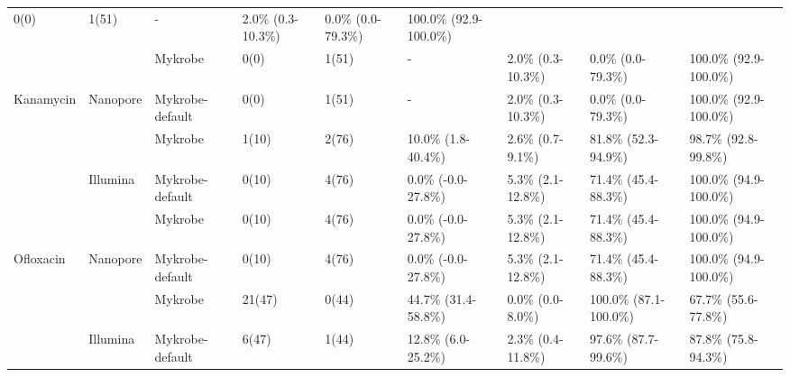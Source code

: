 \begin{table}
{\begin{tabular}{|l|l|l|l|l|l|l|l|l|}
  \cellcolor[HTML]{EFEFEF}0(0) &
  \cellcolor[HTML]{EFEFEF}1(51) &
  \cellcolor[HTML]{EFEFEF}- &
  \cellcolor[HTML]{EFEFEF}2.0\% (0.3-10.3\%) &
  \cellcolor[HTML]{EFEFEF}0.0\% (0.0-79.3\%) &
  \cellcolor[HTML]{EFEFEF}100.0\% (92.9-100.0\%) \\ \cline{2-9} 
 &
   &
  Mykrobe &
  0(0) &
  1(51) &
  - &
  2.0\% (0.3-10.3\%) &
  0.0\% (0.0-79.3\%) &
  100.0\% (92.9-100.0\%) \\ \cline{3-9} 
\multirow{-4}{*}{Kanamycin} &
  \multirow{-2}{*}{Nanopore} &
  \cellcolor[HTML]{EFEFEF}Mykrobe-default &
  \cellcolor[HTML]{EFEFEF}0(0) &
  \cellcolor[HTML]{EFEFEF}1(51) &
  \cellcolor[HTML]{EFEFEF}- &
  \cellcolor[HTML]{EFEFEF}2.0\% (0.3-10.3\%) &
  \cellcolor[HTML]{EFEFEF}0.0\% (0.0-79.3\%) &
  \cellcolor[HTML]{EFEFEF}100.0\% (92.9-100.0\%) \\ \hline
 &
   &
  Mykrobe &
  1(10) &
  2(76) &
  10.0\% (1.8-40.4\%) &
  2.6\% (0.7-9.1\%) &
  81.8\% (52.3-94.9\%) &
  98.7\% (92.8-99.8\%) \\ \cline{3-9} 
 &
  \multirow{-2}{*}{Illumina} &
  \cellcolor[HTML]{EFEFEF}Mykrobe-default &
  \cellcolor[HTML]{EFEFEF}0(10) &
  \cellcolor[HTML]{EFEFEF}4(76) &
  \cellcolor[HTML]{EFEFEF}0.0\% (-0.0-27.8\%) &
  \cellcolor[HTML]{EFEFEF}5.3\% (2.1-12.8\%) &
  \cellcolor[HTML]{EFEFEF}71.4\% (45.4-88.3\%) &
  \cellcolor[HTML]{EFEFEF}100.0\% (94.9-100.0\%) \\ \cline{2-9} 
 &
   &
  Mykrobe &
  0(10) &
  4(76) &
  0.0\% (-0.0-27.8\%) &
  5.3\% (2.1-12.8\%) &
  71.4\% (45.4-88.3\%) &
  100.0\% (94.9-100.0\%) \\ \cline{3-9} 
\multirow{-4}{*}{Ofloxacin} &
  \multirow{-2}{*}{Nanopore} &
  \cellcolor[HTML]{EFEFEF}Mykrobe-default &
  \cellcolor[HTML]{EFEFEF}0(10) &
  \cellcolor[HTML]{EFEFEF}4(76) &
  \cellcolor[HTML]{EFEFEF}0.0\% (-0.0-27.8\%) &
  \cellcolor[HTML]{EFEFEF}5.3\% (2.1-12.8\%) &
  \cellcolor[HTML]{EFEFEF}71.4\% (45.4-88.3\%) &
  \cellcolor[HTML]{EFEFEF}100.0\% (94.9-100.0\%) \\ \hline
 &
   &
  Mykrobe &
  21(47) &
  0(44) &
  44.7\% (31.4-58.8\%) &
  0.0\% (0.0-8.0\%) &
  100.0\% (87.1-100.0\%) &
  67.7\% (55.6-77.8\%) \\ \cline{3-9} 
 &
  \multirow{-2}{*}{Illumina} &
  \cellcolor[HTML]{EFEFEF}Mykrobe-default &
  \cellcolor[HTML]{EFEFEF}6(47) &
  \cellcolor[HTML]{EFEFEF}1(44) &
  \cellcolor[HTML]{EFEFEF}12.8\% (6.0-25.2\%) &
  \cellcolor[HTML]{EFEFEF}2.3\% (0.4-11.8\%) &
  \cellcolor[HTML]{EFEFEF}97.6\% (87.7-99.6\%) &
  \cellcolor[HTML]{EFEFEF}87.8\% (75.8-94.3\%) \\ \cline{2-9} 

\end{tabular}}
\end{table}
